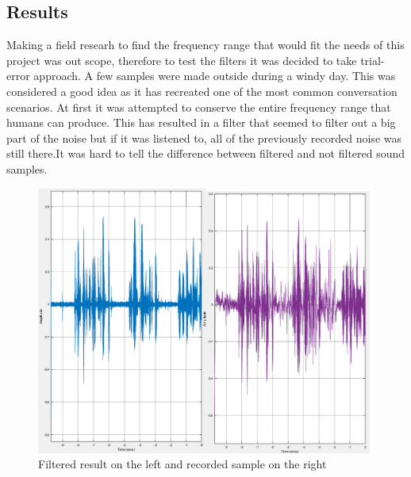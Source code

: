 \subsection{Results}
Making a field researh to find the frequency range that would fit the needs of this project was out scope, therefore to test the filters it was decided to take trial-error approach. A few samples were made outside during a windy day. This was considered a good idea as it has recreated one of the most common conversation scenarios.
At first it was attempted to conserve the entire frequency range that humans can produce. This has resulted in a filter that seemed to filter out a big part of the noise but if it was listened to, all of the previously recorded noise was still there.It was hard to tell the difference between filtered and not filtered sound samples.
\begin{figure}
  \centering
    \includegraphics[width=0.7\paperwidth]{Illustrations/100HZto17KHzfilter}
    \caption{Filtered result on the left and recorded sample on the right}
\end{figure}

  